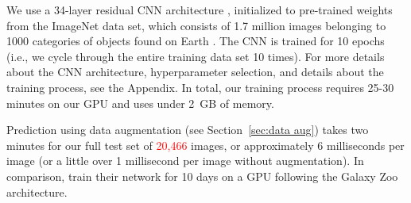 \documentclass[fleqn,usenatbib]{mnras}
\newcommand{\editorial}[1]{\textcolor{red}{#1}}
\begin{document}

We use a 34-layer residual CNN architecture \citep{He2015}, initialized to pre-trained weights from the ImageNet data set, which consists of 1.7 million images belonging to 1000 categories of objects found on Earth \citep[e.g., cats, horses, cars, or books][]{ImageNet}. %
The CNN is trained for 10 epochs (i.e., we cycle through the entire training data set 10 times).
For more details about the CNN architecture, hyperparameter selection, and details about the training process, see the Appendix.
In total, our training process requires 25-30 minutes on our GPU and uses under 2~GB of memory.

Prediction using data augmentation (see Section~\ref{sec:data aug}) takes two minutes for our full test set of \editorial{20,466} images, or approximately 6 milliseconds per image (or a little over 1 millisecond per image without augmentation). In comparison, \cite{Huertas-Company2015} train their network for 10 days on a GPU following the Galaxy Zoo architecture.
\end{document}
